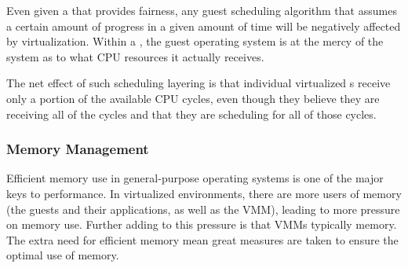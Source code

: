 Even given a  that provides fairness, any guest  scheduling algorithm that assumes a certain amount of progress in a given amount of time will be negatively affected by virtualization.
Within a , the guest operating system is at the mercy of the  system as to what CPU resources it actually receives.

The net effect of such scheduling layering is that individual virtualized s receive only a portion of the available CPU cycles, even though they believe they are receiving all of the cycles and that they are scheduling for all of those cycles.

\subsubsection{Memory Management}\label{subsubsec:VM_Memory_Management}
Efficient memory use in general-purpose operating systems is one of the major keys to performance.
In virtualized environments, there are more users of memory (the guests and their applications, as well as the VMM), leading to more pressure on memory use.
Further adding to this pressure is that VMMs typically  memory.
The extra need for efficient memory mean great measures are taken to ensure the optimal use of memory.


